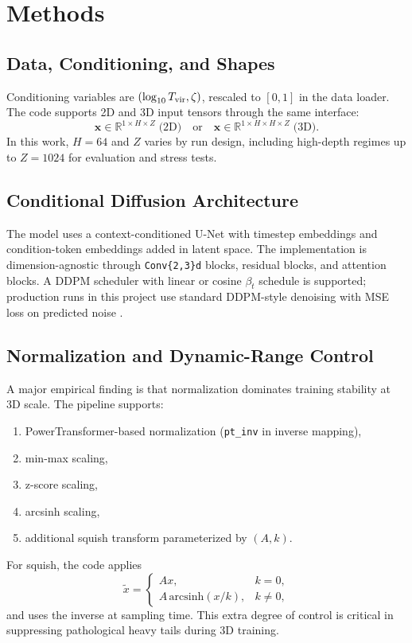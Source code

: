 \documentclass{aastex631}
\begin{document}
\section{Methods}
\subsection{Data, Conditioning, and Shapes}
Conditioning variables are $(\log_{10}T_{\rm vir},\zeta)$, rescaled to $[0,1]$ in the data loader. The code supports 2D and 3D input tensors through the same interface:
\begin{equation}
\mathbf{x}\in \mathbb{R}^{1\times H\times Z} \;\text{(2D)}\quad \text{or}\quad
\mathbf{x}\in \mathbb{R}^{1\times H\times H\times Z} \;\text{(3D)}.
\end{equation}
In this work, $H=64$ and $Z$ varies by run design, including high-depth regimes up to $Z=1024$ for evaluation and stress tests.

\subsection{Conditional Diffusion Architecture}
The model uses a context-conditioned U-Net with timestep embeddings and condition-token embeddings added in latent space. The implementation is dimension-agnostic through \texttt{Conv\{2,3\}d} blocks, residual blocks, and attention blocks. A DDPM scheduler with linear or cosine $\beta_t$ schedule is supported; production runs in this project use standard DDPM-style denoising with MSE loss on predicted noise \citep{ho2020denoising}.

\subsection{Normalization and Dynamic-Range Control}
A major empirical finding is that normalization dominates training stability at 3D scale. The pipeline supports:
\begin{enumerate}
    \item PowerTransformer-based normalization (\texttt{pt\_inv} in inverse mapping),
    \item min-max scaling,
    \item z-score scaling,
    \item arcsinh scaling,
    \item additional squish transform parameterized by $(A,k)$.
\end{enumerate}
For squish, the code applies
\begin{equation}
\tilde{x}=\begin{cases}
A x, & k=0,\\
A\,\mathrm{arcsinh}(x/k), & k\neq 0,
\end{cases}
\end{equation}
and uses the inverse at sampling time. This extra degree of control is critical in suppressing pathological heavy tails during 3D training.
\end{document}
